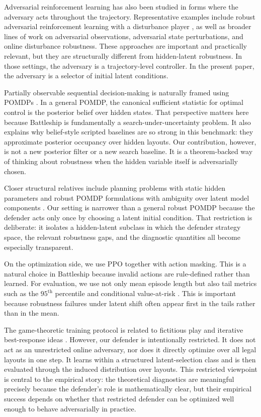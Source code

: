 \documentclass[11pt]{article}
\begin{document}
Adversarial reinforcement learning has also been studied in forms where the adversary acts throughout the trajectory. Representative examples include robust adversarial reinforcement learning with a disturbance player \citep{pinto2017robust}, as well as broader lines of work on adversarial observations, adversarial state perturbations, and online disturbance robustness. These approaches are important and practically relevant, but they are structurally different from hidden-latent robustness. In those settings, the adversary is a trajectory-level controller. In the present paper, the adversary is a selector of initial latent conditions.

Partially observable sequential decision-making is naturally framed using POMDPs \citep{kaelbling1998pomdp}. In a general POMDP, the canonical sufficient statistic for optimal control is the posterior belief over hidden states. That perspective matters here because Battleship is fundamentally a search-under-uncertainty problem. It also explains why belief-style scripted baselines are so strong in this benchmark: they approximate posterior occupancy over hidden layouts. Our contribution, however, is not a new posterior filter or a new search baseline. It is a theorem-backed way of thinking about robustness when the hidden variable itself is adversarially chosen.

Closer structural relatives include planning problems with static hidden parameters and robust POMDP formulations with ambiguity over latent model components \citep{chen2016pomdplite,osogami2015robust}. Our setting is narrower than a general robust POMDP because the defender acts only once by choosing a latent initial condition. That restriction is deliberate: it isolates a hidden-latent subclass in which the defender strategy space, the relevant robustness gaps, and the diagnostic quantities all become especially transparent.

On the optimization side, we use PPO \citep{schulman2017ppo} together with action masking. This is a natural choice in Battleship because invalid actions are rule-defined rather than learned. For evaluation, we use not only mean episode length but also tail metrics such as the $95^{\text{th}}$ percentile and conditional value-at-risk \citep{rockafellar2000cvar,chow2015cvar}. This is important because robustness failures under latent shift often appear first in the tails rather than in the mean.

The game-theoretic training protocol is related to fictitious play and iterative best-response ideas \citep{brown1951fictitious,heinrich2016fsp}. However, our defender is intentionally restricted. It does not act as an unrestricted online adversary, nor does it directly optimize over all legal layouts in one step. It learns within a structured latent-selection class and is then evaluated through the induced distribution over layouts. This restricted viewpoint is central to the empirical story: the theoretical diagnostics are meaningful precisely because the defender's role is mathematically clear, but their empirical success depends on whether that restricted defender can be optimized well enough to behave adversarially in practice.
\end{document}
